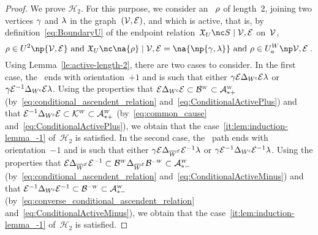 \documentclass[12pt]{article}
\begin{document}
{{{{{\begin{proof}
  We prove ${\mathcal H}_{2}$. For this purpose, we consider an \undirectedEdgePath~$\rho$ of length~$2$,
  joining two vertices $\gamma$ and $\lambda$ in the graph~$({\cal V},{\cal E})$, and 
  which is active, that is, by definition~\eqref{eq:BoundaryU} of the
  endpoint relation~\( \BoundaryU{\SubsetPath}{\OrientedGraph} \) on~${\cal V}$, 
  \begin{equation*}
    \UndirectedPath \in \UPATH^{2}\np{\graph}
    \text{ and }
    \BoundaryU{\na{\UndirectedPath}}{\graph}=\na{ \np{\bgent,\cgent} }
    \text{ and }
    \UndirectedPath \in \ActiveUndirectedPaths{\graph}
    \eqfinp 
  \end{equation*}
  Using Lemma~\ref{le:active-length-2}, there are two cases to consider.
  In the first case, the \undirectedEdgePath\ ends with orientation~$+1$  and is
  such that
  either \(\gamma  {\cal E} \Delta_{W^{\mathsf{c}}}{\cal E}  \lambda\)
  or \(\gamma   {\cal E}^{-1} \Delta_{W^{\mathsf{c}}} {\cal E}  \lambda\).
  Using the properties that
  \( {\cal E} \Delta_{W^{\mathsf{c}}}{\cal E}
  \subset \mathcal{B}^{\text{\tiny $W$}}
  \subset \mathcal{A}^{\text{\tiny $W$}}_{*+}\)
  (by~\eqref{eq:conditional_ascendent_relation} and~\eqref{eq:ConditionalActivePlus})
  and that 
  \( {\cal E}^{-1} \Delta_{W^{\mathsf{c}}} {\cal E}
  \subset \mathcal{K}^{\text{\tiny $W$}} \subset \mathcal{A}^{\text{\tiny $W$}}_{*+}\)
  (by~\eqref{eq:common_cause} and~\eqref{eq:ConditionalActivePlus}),
  we obtain that
  the case~\ref{it:lem:induction-lemma_-1} of~${\mathcal H}_2$ is satisfied.
  In the second case, the \undirectedEdgePath\ path ends with orientation~$-1$ and is
  such that
  either 
  \( \gamma{\cal E} \Delta_{\overline{W}^{\text{\tiny ${\cal E}$}}} {\cal E}^{-1}\lambda \)
  or \( \gamma {\cal E}^{-1} \Delta_{W^{\mathsf{c}}}{\cal E}^{-1} \lambda\).
  Using the properties that
  \({\cal E} \Delta_{\overline{W}^{\text{\tiny ${\cal E}$}}} {\cal E}^{-1}
  \subset   \mathcal{B}^{\text{\tiny $W$}}  \Delta_{\overline{W}^{\text{\tiny ${\cal E}$}}} \mathcal{B}^{\text{\tiny$-W$}}
  \subset \mathcal{A}^{\text{\tiny $W$}}_{*-} \)
  (by~\eqref{eq:conditional_ascendent_relation}
  and~\eqref{eq:ConditionalActiveMinus})
  and that
  \({\cal E}^{-1} \Delta_{W^{\mathsf{c}}}{\cal E}^{-1}
  \subset \mathcal{B}^{\text{\tiny$-W$}}\subset \mathcal{A}^{\text{\tiny $W$}}_{*-}\)
  (by~\eqref{eq:converse_conditional_ascendent_relation}
  and~\eqref{eq:ConditionalActiveMinus}),
  we obtain that the case~\ref{it:lem:induction-lemma_-1} of~${\mathcal H}_2$ is
  satisfied.
  

\end{proof}}}}}}
\end{document}
